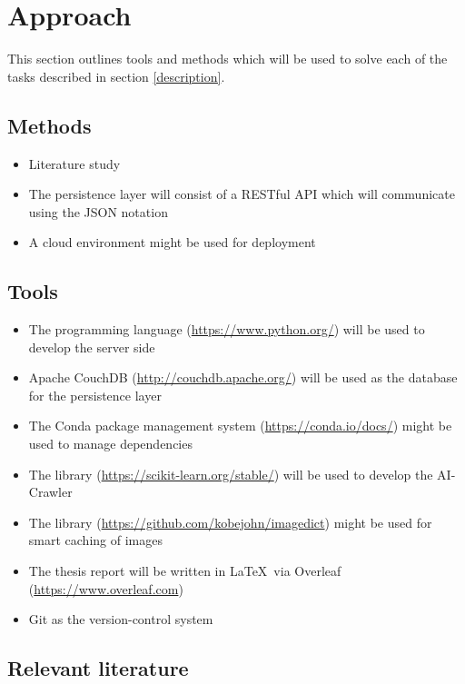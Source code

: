 \section{Approach}

This section outlines tools and methods which will be used to solve each of the tasks described in section \ref{description}.

\subsection{Methods}
\begin{itemize}
    \item Literature study
    \item The persistence layer will consist of a RESTful API which will communicate using the JSON notation
    \item A cloud environment might be used for deployment
\end{itemize}

\subsection{Tools}
 
\begin{itemize}
    \item The \Python programming language (\url{https://www.python.org/}) will be used to develop the server side
    \item Apache CouchDB (\url{http://couchdb.apache.org/}) will be used as the database for the persistence layer
    \item The Conda package management system (\url{https://conda.io/docs/}) might be used to manage \Python dependencies
    \item The \Python library \scikit (\url{https://scikit-learn.org/stable/}) will be used to develop the AI-Crawler
    \item The \Python library \ImageDict (\url{https://github.com/kobejohn/imagedict}) might be used for smart caching of images
    \item The thesis report will be written in \LaTeX ~via Overleaf (\url{https://www.overleaf.com})
    \item Git as the version-control system
\end{itemize}

\subsection{Relevant literature}

